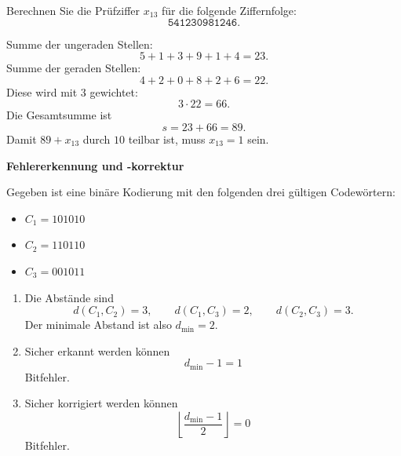 \begin{questions}
Berechnen Sie die Prüfziffer $x_{13}$ für die folgende Ziffernfolge:
\[
	\texttt{541230981246}.
\]
\vspace{30mm}

\begin{solution}
	Summe der ungeraden Stellen:
	\[
		5 + 1 + 3 + 9 + 1 + 4 = 23.
	\]
	Summe der geraden Stellen:
	\[
		4 + 2 + 0 + 8 + 2 + 6 = 22.
	\]
	Diese wird mit \(3\) gewichtet:
	\[
		3 \cdot 22 = 66.
	\]
	Die Gesamtsumme ist
	\[
		s = 23 + 66 = 89.
	\]
	Damit \(89 + x_{13}\) durch \(10\) teilbar ist, muss \(x_{13} = 1\) sein.
\end{solution}

\question
\textbf{Fehlererkennung und -korrektur}

Gegeben ist eine binäre Kodierung mit den folgenden drei gültigen Codewörtern:
\begin{itemize}
	\item $C_1 = 101010$
	\item $C_2 = 110110$
	\item $C_3 = 001011$
\end{itemize}


\begin{solution}
\begin{enumerate}
	\item Die Abstände sind
	\[
		d(C_1, C_2) = 3, \qquad
		d(C_1, C_3) = 2, \qquad
		d(C_2, C_3) = 3.
	\]
	Der minimale Abstand ist also \(d_{\min} = 2\).

	\item Sicher erkannt werden können
	\[
		d_{\min} - 1 = 1
	\]
	Bitfehler.

	\item Sicher korrigiert werden können
	\[
		\left\lfloor \frac{d_{\min} - 1}{2} \right\rfloor = 0
	\]
	Bitfehler.
\end{enumerate}
\end{solution}

\end{questions}